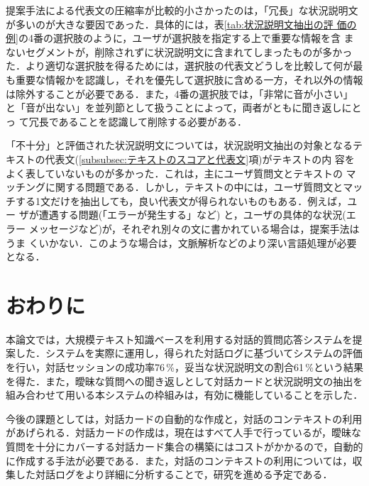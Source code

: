 提案手法による代表文の圧縮率が比較的小さかったのは，「冗長」な状況説明文
が多いのが大きな要因であった．具体的には，表\ref{tab:状況説明文抽出の評
価の例}の4番の選択肢のように，ユーザが選択肢を指定する上で重要な情報を含
まないセグメントが，削除されずに状況説明文に含まれてしまったものが多かっ
た．より適切な選択肢を得るためには，選択肢の代表文どうしを比較して何が最
も重要な情報かを認識し，それを優先して選択肢に含める一方，それ以外の情報
は除外することが必要である．また，4番の選択肢では，「非常に音が小さい」
と「音が出ない」を並列節として扱うことによって，両者がともに聞き返しにとっ
て冗長であることを認識して削除する必要がある．


「不十分」と評価された状況説明文については，状況説明文抽出の対象となるテ
キストの代表文(\ref{subsubsec:テキストのスコアと代表文}項)がテキストの内
容をよく表していないものが多かった．これは，主にユーザ質問文とテキストの
マッチングに関する問題である．しかし，テキストの中には，ユーザ質問文とマッ
チする1文だけを抽出しても，良い代表文が得られないものもある．例えば，ユー
ザが遭遇する問題(「エラーが発生する」など) と，ユーザの具体的な状況(エラー
メッセージなど)が，それぞれ別々の文に書かれている場合は，提案手法はうま
くいかない．このような場合は，文脈解析などのより深い言語処理が必要となる．



\section{おわりに}  \label{sec:おわりに}

本論文では，大規模テキスト知識ベースを利用する対話的質問応答システムを提
案した．システムを実際に運用し，得られた対話ログに基づいてシステムの評価
を行い，対話セッションの成功率76\,\%，妥当な状況説明文の割合61\,\%という結果
を得た．また，曖昧な質問への聞き返しとして対話カードと状況説明文の抽出を
組み合わせて用いる本システムの枠組みは，有効に機能していることを示した．

今後の課題としては，対話カードの自動的な作成と，対話のコンテキストの利用
があげられる．対話カードの作成は，現在はすべて人手で行っているが，曖昧な
質問を十分にカバーする対話カード集合の構築にはコストがかかるので，自動的
に作成する手法が必要である．また，対話のコンテキストの利用については，収
集した対話ログをより詳細に分析することで，研究を進める予定である．









